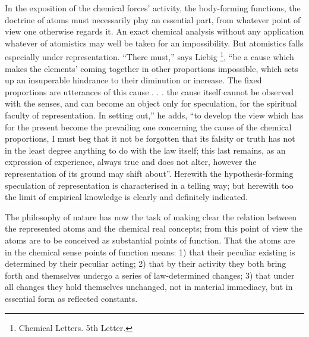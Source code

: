 \documentclass[12pt,a4paper]{book}
\begin{document}
In the exposition of the chemical forces' activity, the body-forming functions, the doctrine of atoms must necessarily
play an essential part, from whatever point of view one otherwise regards it. An exact chemical analysis without any
application whatever of atomistics may well be taken for an impossibility. But atomistics falls especially under
representation. ``There must,'' says Liebig %
\footnote{%
Chemical Letters. 5th Letter.}, ``be a cause which makes the elements' coming together in other proportions impossible,
which sets up an insuperable hindrance to their diminution or increase. The fixed proportions are utterances of this
cause . . . the cause itself cannot be observed with the senses, and can become an object only for speculation, for the
spiritual faculty of representation. In setting out,'' he adds, ``to develop the view which has for the present become
the prevailing one concerning the cause of the chemical proportions, I must beg that it not be forgotten that its
falsity or truth has not in the least degree anything to do with the law itself; this last remains, as an expression of
experience, always true and does not alter, however the representation of its ground may shift about''. Herewith the
hypothesis-forming speculation of representation is characterised in a telling way; but herewith too the limit of
empirical knowledge is clearly and definitely indicated.

The philosophy of nature has now the task of making clear the relation between the represented atoms and the chemical
real concepts; from this point of view the atoms are to be conceived as substantial points of function. That the atoms
are in the chemical sense points of function means: 1) that their peculiar existing is determined by their peculiar
acting; 2) that by their activity they both bring forth and themselves undergo a series of law-determined changes; 3)
that under all changes they hold themselves unchanged, not in material immediacy, but in essential form as reflected
constants.
\end{document}
